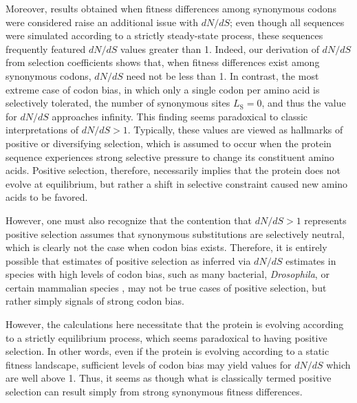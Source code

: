 \documentclass[11pt]{article}
\begin{document}
Moreover, results obtained when fitness differences among synonymous codons were considered raise an additional issue with $dN/dS$; even though all sequences were simulated according to a strictly steady-state process, these sequences frequently featured $dN/dS$ values greater than 1. Indeed, our derivation of $dN/dS$ from selection coefficients shows that, when fitness differences exist among synonymous codons, $dN/dS$ need not be less than 1. In contrast, the most extreme case of codon bias, in which only a single codon per amino acid is selectively tolerated, the number of synonymous sites $L_\text{S} = 0$, and thus the value for $dN/dS$ approaches infinity. This finding seems paradoxical to classic interpretations of $dN/dS >1$. Typically, these values are viewed as hallmarks of positive or diversifying selection, which is assumed to occur when the protein sequence experiences strong selective pressure to change its constituent amino acids. Positive selection, therefore, necessarily implies that the protein does not evolve at equilibrium, but rather a shift in selective constraint caused new amino acids to be favored. 


However, one must also recognize that the contention that $dN/dS > 1$ represents positive selection assumes that synonymous substitutions are selectively neutral, which is clearly not the case when codon bias exists. Therefore, it is entirely possible that estimates of positive selection as inferred via $dN/dS$ estimates in species with high levels of codon bias, such as many bacterial, \textit{Drosophila}, or certain mammalian species \cite{Duret2002, Chamaryetal2006, HershbergPetrov2008, PlotkinKudla2010}, may not be true cases of positive selection, but rather simply signals of strong codon bias.


However, the calculations here necessitate that the protein is evolving according to a strictly equilibrium process, which seems paradoxical to having positive selection. In other words, even if the protein is evolving according to a static fitness landscape, sufficient levels of codon bias may yield values for $dN/dS$ which are well above 1. Thus, it seems as though what is classically termed positive selection can result simply from strong synonymous fitness differences.
 







\clearpage
\newpage

	

\clearpage
\newpage
\end{document}
